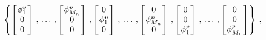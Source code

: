 \documentclass[12pt, a4paper, twoside, openright, notitlepage]{report}
\numberwithin{equation}{chapter}
\theoremstyle{theorem}
\theoremstyle{definition}
\theoremstyle{remark}
\theoremstyle{proposition}
\numberwithin{figure}{chapter}
\newcommand{\bg}[1]{\boldsymbol{#1}}
\begin{document}
		\begin{equation*}
			\left\{ 
			\begin{bmatrix}
			\hspace*{-0.15cm}
			\begin{array}{c}
				\phi_1^{\bg{v}} \\ 
				0 \\ 
				0 
			\end{array} 
			\hspace*{-0.15cm}
			\end{bmatrix}
			\, , \, \ldots \, , 
			\begin{bmatrix}
			\hspace*{-0.15cm}
			\begin{array}{c}
				\phi_{M_n}^{\bg{v}} \\ 
				0 \\ 
				0 
			\end{array} 
			\hspace*{-0.15cm}
			\end{bmatrix}
			\, ,
			\begin{bmatrix}
			\hspace*{-0.15cm}
			\begin{array}{c}
				0 \\ 
				\phi_1^{\bg{v}} \\ 
				0 
			\end{array} 
			\hspace*{-0.15cm}
			\end{bmatrix}
			\, , \, \ldots \, ,
			\begin{bmatrix}
			\hspace*{-0.15cm}
			\begin{array}{c}
				0 \\ 
				\phi_{M_n}^{\bg{v}} \\ 
				0 
			\end{array} 
			\hspace*{-0.15cm}
			\end{bmatrix}
			\, ,
			\begin{bmatrix}
			\hspace*{-0.15cm}
			\begin{array}{c}
				0 \\ 
				0 \\ 
				\phi_1^{p} 
			\end{array} 
			\hspace*{-0.15cm}
			\end{bmatrix}
			\, , \, \ldots \, ,
			\begin{bmatrix}
			\hspace*{-0.15cm}
			\begin{array}{c}
				0 \\ 
				0 \\ 
				\phi_{M_v}^{p} 
			\end{array} 
			\hspace*{-0.15cm}
			\end{bmatrix}
			\right\} \, ,
		\end{equation*}
\end{document}
